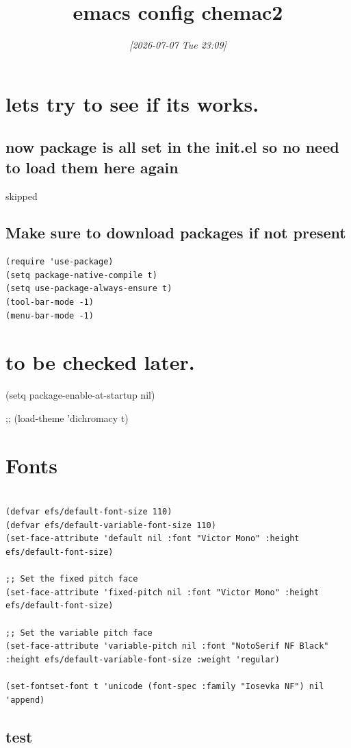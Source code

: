 \documentclass[11pt]{article}
\date{\textit{{[}2026-07-07 Tue 23:09]}}
\title{emacs config chemac2}
\begin{document}
\maketitle
\tableofcontents

\section{lets try to see if its works.}
\label{sec:org595e3bd}
\subsection{now package is all set in the init.el so no need to load them here again}
\label{sec:org830dcd5}
skipped
\subsection{Make sure to download packages if not present}
\label{sec:orgc8c68ee}
\begin{verbatim}
(require 'use-package)
(setq package-native-compile t)
(setq use-package-always-ensure t)
(tool-bar-mode -1)
(menu-bar-mode -1)
\end{verbatim}
\section{to be checked later.}
\label{sec:orgb12dc84}
(setq package-enable-at-startup nil)

;; (load-theme 'dichromacy t)
\section{Fonts}
\label{sec:orgfb22af5}
\begin{verbatim}

(defvar efs/default-font-size 110)
(defvar efs/default-variable-font-size 110)
(set-face-attribute 'default nil :font "Victor Mono" :height efs/default-font-size)

;; Set the fixed pitch face
(set-face-attribute 'fixed-pitch nil :font "Victor Mono" :height efs/default-font-size)

;; Set the variable pitch face
(set-face-attribute 'variable-pitch nil :font "NotoSerif NF Black" :height efs/default-variable-font-size :weight 'regular)

(set-fontset-font t 'unicode (font-spec :family "Iosevka NF") nil 'append)

\end{verbatim}
\subsection{test}
\label{sec:org68e4120}
\end{document}
